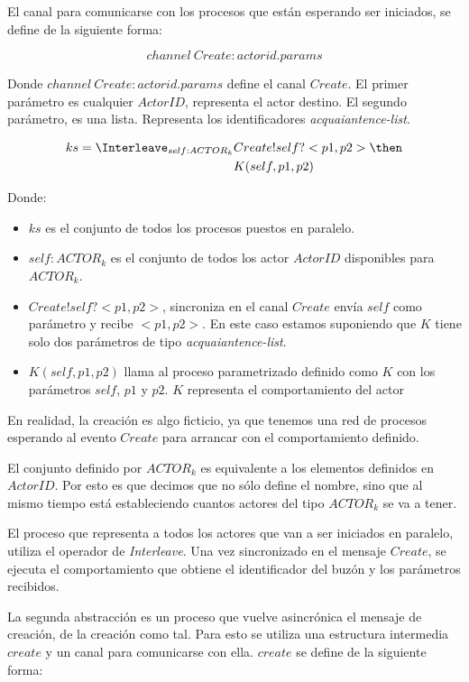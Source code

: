 El canal para comunicarse con los procesos que están esperando ser iniciados, se define de la siguiente forma:

\[
channel\ Create:actorid.params
\]

Donde $channel\ Create:actorid.params$ define el canal $Create$. El primer parámetro es cualquier $ActorID$, representa el actor destino. El segundo parámetro, es una lista. Representa los identificadores \textit{acquaiantence-list}. 

\begin{align*}
ks = \Interleave_{ self : ACTOR_k } & Create!self?<p1, p2> \then \\
& K(self, p1, p2) 
\end{align*}

Donde:

\begin{itemize}
 \item $ks$ es el conjunto de todos los procesos puestos en paralelo.
 \item $self : ACTOR_k$ es el conjunto de todos los actor $ActorID$ disponibles para $ACTOR_k$.
 \item $Create!self?<p1, p2>$, sincroniza en el canal $Create$ envía $self$ como parámetro y recibe $<p1, p2>$. En este caso estamos suponiendo que $K$ tiene solo dos parámetros de tipo \textit{acquaiantence-list}.
 \item $K(self, p1, p2)$ llama al proceso parametrizado definido como $K$ con los parámetros $self$, $p1$ y $p2$. $K$ representa el comportamiento del actor
\end{itemize}

En realidad, la creación es algo ficticio, ya que tenemos una red de procesos \CSP esperando al evento $Create$ para arrancar con el comportamiento definido. 

El conjunto definido por $ACTOR_k$ es equivalente a los elementos definidos en $ActorID$. Por esto es que decimos que no sólo define el nombre, sino que al mismo tiempo está estableciendo cuantos actores del tipo $ACTOR_k$ se va a tener.

El proceso que representa a todos los actores que van a ser iniciados en paralelo, utiliza el operador de \textit{Interleave}. Una vez sincronizado en el mensaje $Create$, se ejecuta el comportamiento que obtiene el identificador del buzón y los parámetros recibidos. 

La segunda abstracción es un proceso que vuelve asincrónica el mensaje de creación, de la creación como tal. Para esto se utiliza una estructura intermedia $create$ y un canal para comunicarse con ella. $create$ se define de la siguiente forma: 

